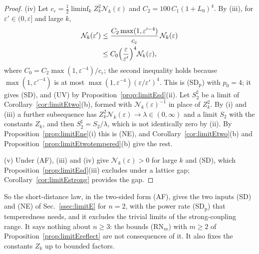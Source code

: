 \documentclass[aps,prd,twocolumn,superscriptaddress,nofootinbib,longbibliography,floatfix,amsmath,amssymb,10pt]{revtex4-2}
\theoremstyle{definition}
\theoremstyle{remark}
\begin{document}
\begin{proof}
(iv) Let $c_\varepsilon=\frac12\liminf_kZ_k^2\mathcal N_k(\varepsilon)$
and $C_2=100\,C_1(1+L_0)^4$. By (iii), for $\varepsilon'\in(0,\varepsilon]$
and large $k$,
\[
\begin{aligned}
\mathcal N_k(\varepsilon')&\le\frac{C_2\max(1,\varepsilon'^{-4})}
{c_\varepsilon}\,\mathcal N_k(\varepsilon)\\
&\le C_0\Bigl(\frac\varepsilon{\varepsilon'}\Bigr)^4\mathcal N_k(\varepsilon),
\end{aligned}
\]
where $C_0=C_2\max(1,\varepsilon^{-4})/c_\varepsilon$; the second
inequality holds because $\max(1,\varepsilon'^{-4})$ is at most
$\max(1,\varepsilon^{-4})(\varepsilon/\varepsilon')^4$. This is (SD$_{\mathrm p}$) with $p_0=4$; it gives (SD),
and (UV) by Proposition~\ref{prop:limitEsd}(ii). Let $S^\sharp_2$ be a limit
of Corollary~\ref{cor:limitEtwo}(b), formed with $\mathcal N_k(\varepsilon)
^{-1}$ in place of $Z_k^2$. By (i) and (iii) a further subsequence has
$Z_k^2\mathcal N_k(\varepsilon)\to\lambda\in(0,\infty)$ and a limit $S_2$
with the constants $Z_k$, and then $S^\sharp_2=S_2/\lambda$, which is not
identically zero by (ii). By Proposition~\ref{prop:limitEne}(i) this is
(NE), and Corollary~\ref{cor:limitEtwo}(b) and
Proposition~\ref{prop:limitEtwotempered}(b) give the rest.

(v) Under (AF), (iii) and (iv) give $\mathcal N_k(\varepsilon)>0$ for large
$k$ and (SD), which Proposition~\ref{prop:limitEsd}(iii) excludes under a
lattice gap; Corollary~\ref{cor:limitEstrong} provides the gap.
\end{proof}

So the short-distance law, in the two-sided form (AF), gives the two inputs
(SD) and (NE) of Sec.~\ref{ssec:limitE} for $n=2$, with the power rate
(SD$_{\mathrm p}$) that temperedness needs, and it excludes the trivial
limits of the strong-coupling range. It says nothing about $n\ge3$: the
bounds (RN$_m$) with $m\ge2$ of Proposition~\ref{prop:limitEreflect} are
not consequences of it. It also fixes the constants $Z_k$ up to bounded
factors.
\end{document}
